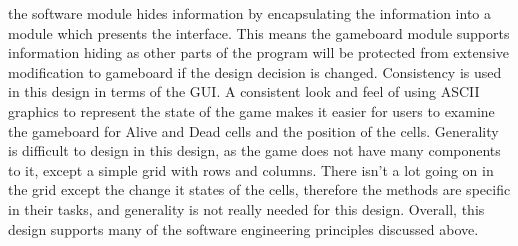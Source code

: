 \documentclass[12pt]{article}
\begin{document}
\begin{itemize}
the software module hides information by encapsulating the information into a module which presents the interface. This means the gameboard module supports information hiding as other parts of the 
program will be protected from extensive modification to gameboard if the design decision is changed. Consistency is used in this design in terms of the GUI. A consistent look and feel
of using ASCII graphics to represent the state of the game makes it easier for users to examine the gameboard for Alive and Dead cells and the position of the cells. Generality is difficult to design in 
this design, as the game does not have many components to it, except a simple grid with rows and columns. There isn't a lot going on in the grid except the change it states of the cells, therefore the methods
are specific in their tasks, and generality is not really needed for this design. Overall, this design supports many of the software engineering principles discussed above.
\end{itemize}
\end{document}
